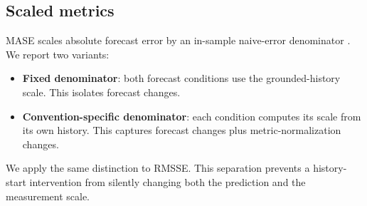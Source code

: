\subsection{Scaled metrics}

MASE scales absolute forecast error by an in-sample naive-error denominator \citep{hyndman2006mase}. We report two variants:
\begin{itemize}[leftmargin=1.5em]
    \item \textbf{Fixed denominator}: both forecast conditions use the grounded-history scale. This isolates forecast changes.
    \item \textbf{Convention-specific denominator}: each condition computes its scale from its own history. This captures forecast changes plus metric-normalization changes.
\end{itemize}
We apply the same distinction to RMSSE. This separation prevents a history-start intervention from silently changing both the prediction and the measurement scale.
